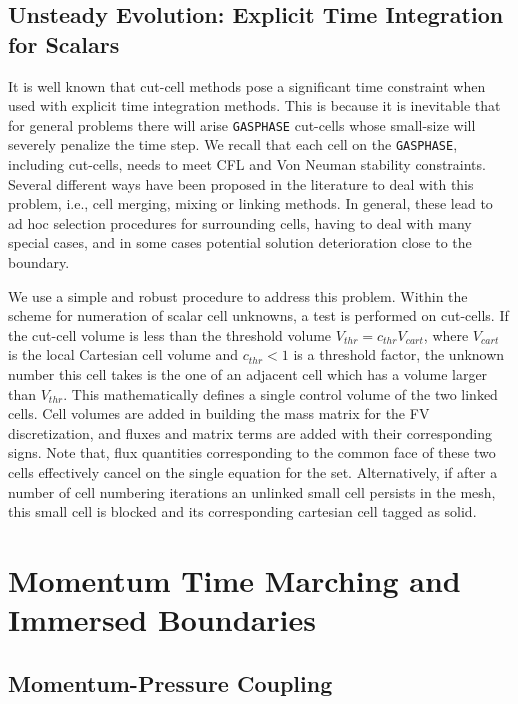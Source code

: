 \subsection{Unsteady Evolution: Explicit Time Integration for Scalars} \label{sec:exscl}

It is well known that cut-cell methods pose a significant time constraint when used with explicit time integration methods.
This is because it is inevitable that for general problems there will arise \texttt{GASPHASE} cut-cells whose small-size will severely penalize
the time step. We recall that each cell on the \texttt{GASPHASE}, including cut-cells, needs to meet CFL and Von Neuman stability constraints. Several different ways have been proposed in the literature to deal with this problem, i.e., cell merging, mixing or linking methods. In general, these lead to ad hoc selection procedures for surrounding cells, having to deal with many special cases, and in some cases potential solution deterioration close to the boundary.

We use a simple and robust procedure to address this problem. Within the scheme for numeration of scalar cell unknowns, a test is performed on cut-cells. If the cut-cell volume is less than the threshold volume $V_{thr}= c_{thr} V_{cart}$, where $V_{cart}$ is the local Cartesian cell volume and $c_{thr}<1$ is a threshold factor, the unknown number this cell takes is the one of an adjacent cell which has a volume larger than $V_{thr}$. This mathematically defines a single control volume of the two linked cells. Cell volumes are added in building the mass matrix for the FV discretization, and fluxes and matrix terms are added with their corresponding signs. Note that, flux quantities corresponding to the common face of these two cells effectively cancel on the single equation for the set.
Alternatively, if after a number of cell numbering iterations an unlinked small cell persists in the mesh, this small cell is blocked and its corresponding cartesian cell tagged as solid.

\section{Momentum Time Marching and Immersed Boundaries}

\subsection{Momentum-Pressure Coupling}

